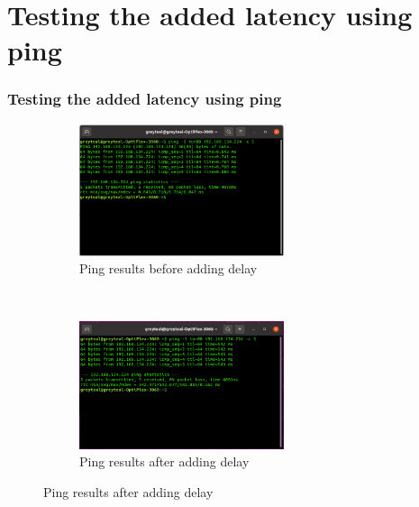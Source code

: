 \documentclass[xcolor=table]{beamer}
\begin{document}
\section{Testing the added latency using ping}
\begin{frame}
\frametitle{Testing the added latency using ping}
\begin{figure}[t!]
    \centering
    \begin{subfigure}[t]{0.5\textwidth}
        \centering
        \includegraphics[width = 6cm]{./figs/Ping_before_adding_delay.png}
        \caption{Ping results before adding delay}
    \end{subfigure}%
    ~ 
    \begin{subfigure}[t]{0.5\textwidth}
        \centering
        \includegraphics[width = 6cm]{./figs/Ping_after_adding_delay.png}
        \caption{Ping results after adding delay}
    \end{subfigure}
\end{figure} 	
\end{frame}
\end{document}
